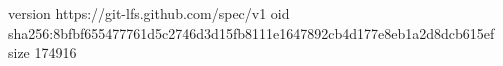 version https://git-lfs.github.com/spec/v1
oid sha256:8bfbf655477761d5c2746d3d15fb8111e1647892cb4d177e8eb1a2d8dcb615ef
size 174916

